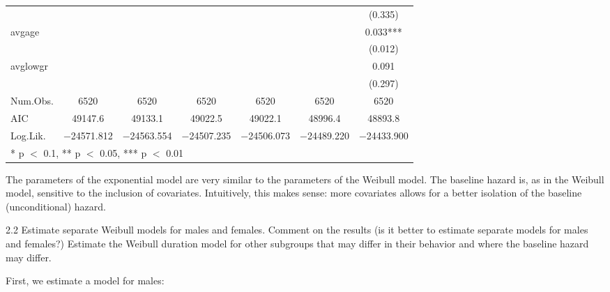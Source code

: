 \documentclass[
]{article}
\begin{document}
\begin{table}[!h]
{\begin{tabular}[t]{lcccccc}
 &  &  &  &  &  & (\num{0.335})\\
avgage &  &  &  &  &  & \num{0.033}***\\
 &  &  &  &  &  & (\num{0.012})\\
avglowgr &  &  &  &  &  & \num{0.091}\\
 &  &  &  &  &  & (\num{0.297})\\
\midrule
Num.Obs. & \num{6520} & \num{6520} & \num{6520} & \num{6520} & \num{6520} & \num{6520}\\
AIC & \num{49147.6} & \num{49133.1} & \num{49022.5} & \num{49022.1} & \num{48996.4} & \num{48893.8}\\
Log.Lik. & \num{-24571.812} & \num{-24563.554} & \num{-24507.235} & \num{-24506.073} & \num{-24489.220} & \num{-24433.900}\\
\bottomrule
\multicolumn{7}{l}{\rule{0pt}{1em}* p $<$ 0.1, ** p $<$ 0.05, *** p $<$ 0.01}\\
\end{tabular}}
\end{table}

The parameters of the exponential model are very similar to the
parameters of the Weibull model. The baseline hazard is, as in the
Weibull model, sensitive to the inclusion of covariates. Intuitively,
this makes sense: more covariates allows for a better isolation of the
baseline (unconditional) hazard.

\clearpage

2.2 Estimate separate Weibull models for males and females. Comment on
the results (is it better to estimate separate models for males and
females?) Estimate the Weibull duration model for other subgroups that
may differ in their behavior and where the baseline hazard may differ.

First, we estimate a model for males:
\end{document}
